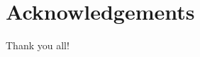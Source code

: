 \chapter*{Acknowledgements} %
\label{cha:acknowledgements}
\mtcaddchapter[Acknowledgements]

Thank you all!  

